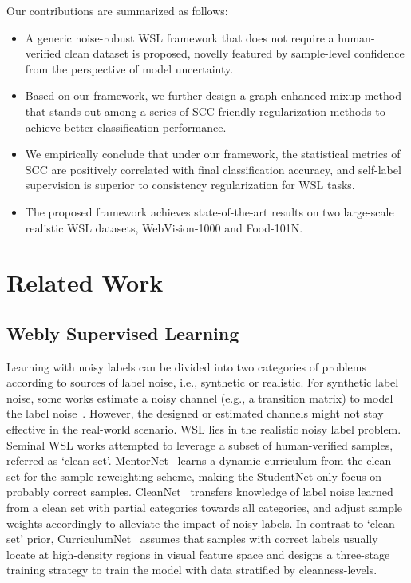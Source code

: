 \documentclass[runningheads]{llncs}
\begin{document}
Our contributions are summarized as follows:
\begin{itemize}
	\item A generic noise-robust WSL framework that does not require a human-verified clean dataset is proposed, novelly featured by sample-level confidence from the perspective of model uncertainty.
	\item Based on our framework, we further design a graph-enhanced mixup method that stands out among a series of SCC-friendly regularization methods to achieve better classification performance.
    \item We empirically conclude that under our framework, the statistical metrics of SCC are positively correlated with final classification accuracy, and self-label supervision is superior to consistency regularization for WSL tasks.
	\item The proposed framework achieves state-of-the-art results on two large-scale realistic WSL datasets,  WebVision-1000 and Food-101N.
\end{itemize}


\section{Related Work}

\subsection{Webly Supervised Learning}
Learning with noisy labels can be divided into two categories of problems according to sources of label noise, i.e., synthetic or realistic. For synthetic label noise, some works estimate a noisy channel (e.g., a transition matrix) to model the label noise~\cite{patrini2017making,xia2019anchor,yu2018efficient}. However, the designed or estimated channels might not stay effective in the real-world scenario.
WSL lies in the realistic noisy label problem. Seminal WSL works attempted to leverage a subset of human-verified samples, referred as `clean set'. 
MentorNet~\cite{jiang2018mentornet} learns a dynamic curriculum from the clean set for the sample-reweighting scheme, making the StudentNet only focus on probably correct samples. CleanNet~\cite{lee2018cleannet} transfers knowledge of label noise learned from a clean set with partial categories towards all categories, and adjust sample weights accordingly to alleviate the impact of noisy labels. In contrast to `clean set' prior, CurriculumNet~\cite{guo2018curriculumnet} assumes that samples with correct labels usually locate at high-density regions in visual feature space and designs a three-stage training strategy to train the model with data stratified by cleanness-levels.
\end{document}
